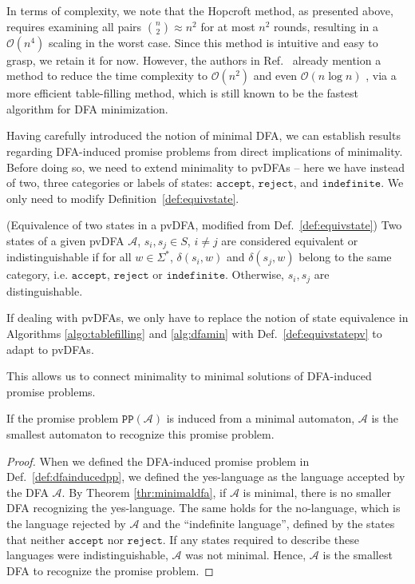 \documentclass[../main.tex]{subfiles}
\begin{document}
In terms of complexity, we note that the Hopcroft method, as presented above, requires examining all pairs $\binom{n}{2} \approx n^2$ for at most $n^2$ rounds, resulting in a $\mathcal{O}(n^4)$ scaling in the worst case. Since this method is intuitive and easy to grasp, we retain it for now. However, the authors in Ref.~\cite{hopcroft2001introduction} already mention a method to reduce the time complexity to $\mathcal{O}(n^2)$ and even $\mathcal{O}(n \log n)$ \cite{knuutila2001re, berstel2010minimization}, via a more efficient table-filling method, which is still known to be the fastest algorithm for \ac{DFA} minimization.

Having carefully introduced the notion of minimal \ac{DFA}, we can establish results regarding DFA-induced promise problems from direct implications of minimality. Before doing so, we need to extend minimality to \acp{pvDFA} -- here we have instead of two, three categories or labels of states: $\mathtt{accept}$, $\mathtt{reject}$, and $\mathtt{indefinite}$. We only need to modify Definition~\ref{def:equivstate}.

\begin{definition}
    \label{def:equivstatepv}
    (Equivalence of two states in a pvDFA, modified from Def.~\ref{def:equivstate}) Two states of a given \ac{pvDFA} $\mathcal{A}$, $s_i,s_j\in S$, $i \neq j$ are considered equivalent or indistinguishable if for all $w \in \Sigma^*$, $\delta(s_i,w)$ and $\delta(s_j,w)$ belong to the same category, i.e. $\mathtt{accept}$, $\mathtt{reject}$  or $\mathtt{indefinite}$. Otherwise,  $s_i,s_j$ are distinguishable.
\end{definition}

If dealing with \acp{pvDFA}, we only have to replace the notion of state equivalence in Algorithms \ref{algo:tablefilling} and \ref{alg:dfamin} with Def.~\ref{def:equivstatepv} to adapt to \acp{pvDFA}. 

This allows us to connect minimality to minimal solutions of DFA-induced promise problems.

\begin{proposition}
    If the promise problem $\mathtt{PP}(\mathcal{A})$ is induced from a minimal automaton, $\mathcal{A}$ is the smallest automaton to recognize this promise problem.
\end{proposition}

\begin{proof}
    When we defined the \ac{DFA}-induced promise problem in Def.~\ref{def:dfainducedpp}, we defined the yes-language as the language accepted by the \ac{DFA} $\mathcal{A}$. By Theorem \ref{thr:minimaldfa}, if $\mathcal{A}$ is minimal, there is no smaller \ac{DFA} recognizing the yes-language. The same holds for the no-language, which is the language rejected by $\mathcal{A}$ and the ``indefinite language'', defined by the states that neither $\mathtt{accept}$ nor $\mathtt{reject}$. If any states required to describe these languages were indistinguishable, $\mathcal{A}$ was not minimal. Hence, $\mathcal{A}$ is the smallest \ac{DFA} to recognize the promise problem.
\end{proof}
\end{document}
